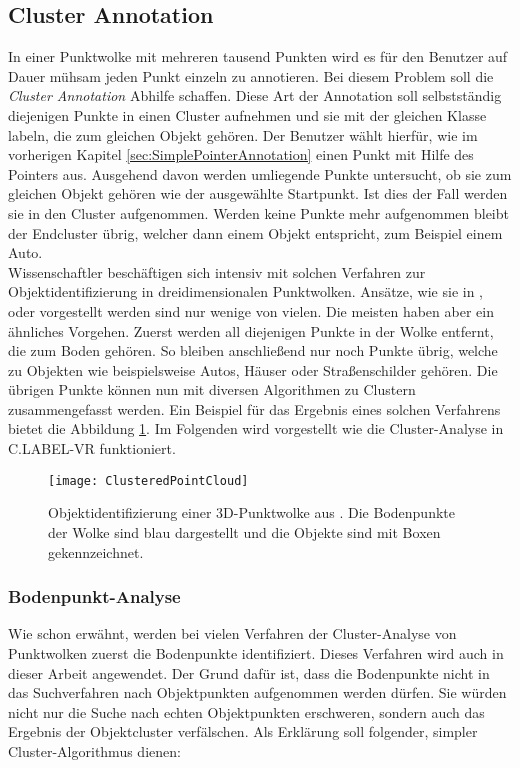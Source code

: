 \subsection{Cluster Annotation}
\label{sec:ClusterLabeling}
In einer Punktwolke mit mehreren tausend Punkten wird es für den Benutzer auf Dauer mühsam jeden Punkt einzeln zu annotieren. Bei diesem Problem soll die \textit{Cluster Annotation} Abhilfe schaffen. Diese Art der Annotation soll selbstständig diejenigen Punkte in einen Cluster aufnehmen und sie mit der gleichen Klasse labeln, die zum gleichen Objekt gehören. Der Benutzer wählt hierfür, wie im vorherigen Kapitel \ref{sec:SimplePointerAnnotation} einen Punkt mit Hilfe des Pointers aus. Ausgehend davon werden umliegende Punkte untersucht, ob sie zum gleichen Objekt gehören wie der ausgewählte Startpunkt. Ist dies der Fall werden sie in den Cluster aufgenommen. Werden keine Punkte mehr aufgenommen bleibt der Endcluster übrig, welcher dann einem Objekt entspricht, zum Beispiel einem Auto. \\

Wissenschaftler beschäftigen sich intensiv mit solchen Verfahren zur Objektidentifizierung in dreidimensionalen Punktwolken. Ansätze, wie sie in \cite{bib:Segmentation1}, \cite{bib:Segmentation2} oder \cite{bib:Segmentation3} vorgestellt werden sind nur wenige von vielen. Die meisten haben aber ein ähnliches Vorgehen. Zuerst werden all diejenigen Punkte in der Wolke entfernt, die zum Boden gehören. So bleiben anschließend nur noch Punkte übrig, welche zu Objekten wie beispielsweise Autos, Häuser oder Straßenschilder gehören. Die übrigen Punkte können nun mit diversen Algorithmen zu Clustern zusammengefasst werden. Ein Beispiel für das Ergebnis eines solchen Verfahrens bietet die Abbildung \ref{fig:ClusteredCloud}. Im Folgenden wird vorgestellt wie die Cluster-Analyse in C.LABEL-VR funktioniert.

\begin{figure}%
	\centering
    \texttt{[image: ClusteredPointCloud]}
    \caption{Objektidentifizierung einer 3D-Punktwolke aus \cite{bib:Segmentation1}. Die Bodenpunkte der Wolke sind blau dargestellt und die Objekte sind mit Boxen gekennzeichnet.}
    \label{fig:ClusteredCloud}
\end{figure}

\subsubsection{Bodenpunkt-Analyse}
\label{sec:GroundPointSegmentation}
Wie schon erwähnt, werden bei vielen Verfahren der Cluster-Analyse von Punktwolken zuerst die Bodenpunkte identifiziert. Dieses Verfahren wird auch in dieser Arbeit angewendet. Der Grund dafür ist, dass die Bodenpunkte nicht in das Suchverfahren nach Objektpunkten aufgenommen werden dürfen. Sie würden nicht nur die Suche nach echten Objektpunkten erschweren, sondern auch das Ergebnis der Objektcluster verfälschen. Als Erklärung soll folgender, simpler Cluster-Algorithmus dienen:

